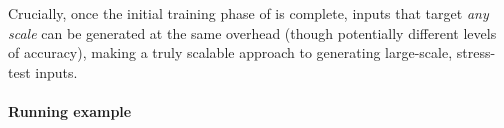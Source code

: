 Crucially, once the initial training phase of \lancet is complete, inputs that target {\em any scale} can be generated at the same overhead (though potentially different levels of accuracy), making \lancet a truly scalable approach to generating large-scale, stress-test inputs.

\paragraph{Running example}

%




